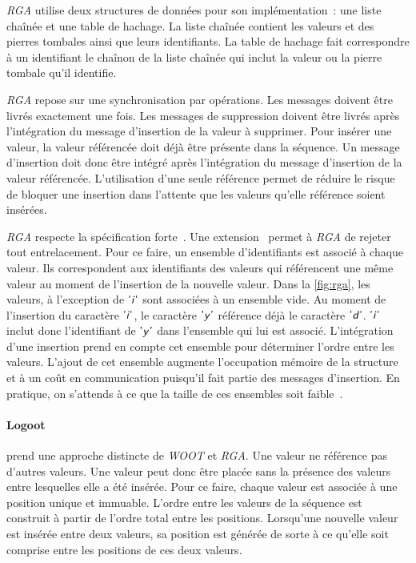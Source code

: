 \emph{RGA} utilise deux structures de données pour son implémentation~: une liste chaînée et une table de hachage.
La liste chaînée contient les valeurs et des pierres tombales ainsi que leurs identifiants.
La table de hachage fait correspondre à un identifiant le chaînon de la liste chaînée qui inclut la valeur ou la pierre tombale qu'il identifie.

\emph{RGA} repose sur une synchronisation par opérations.
Les messages doivent être livrés exactement une fois.
Les messages de suppression doivent être livrés après l'intégration du message d'insertion de la valeur à supprimer.
Pour insérer une valeur, la valeur référencée doit déjà être présente dans la séquence.
Un message d'insertion doit donc être intégré après l'intégration du message d'insertion de la valeur référencée.
L'utilisation d'une seule référence permet de réduire le risque de bloquer une insertion dans l'attente que les valeurs qu'elle référence soient insérées.

\emph{RGA} respecte la spécification forte~\autocite{attiyai_2016_spec-text-editing}.
Une extension~\autocite{kleppmann2019_interleaving} permet à \emph{RGA} de rejeter tout entrelacement.
Pour ce faire, un ensemble d'identifiants est associé à chaque valeur.
Ils correspondent aux identifiants des valeurs qui référencent une même valeur au moment de l'insertion de la nouvelle valeur.
Dans la \autoref{fig:rga}, les valeurs, à l'exception de $\textsf{'\textit{i}'}$ sont associées à un ensemble vide.
Au moment de l'insertion du caractère $\textsf{'\textit{i}'}$, le caractère $\textsf{'\textit{y}'}$ référence déjà le caractère $\textsf{'\textit{d}'}$.
$\textsf{'\textit{i}'}$ inclut donc l'identifiant de $\textsf{'\textit{y}'}$ dans l'ensemble qui lui est associé.
L'intégration d'une insertion prend en compte cet ensemble pour déterminer l'ordre entre les valeurs.
L'ajout de cet ensemble augmente l'occupation mémoire de la structure et à un coût en communication puisqu'il fait partie des messages d'insertion.
En pratique, on s'attends à ce que la taille de ces ensembles soit faible~\autocite{kleppmann2019_interleaving}.




\paragraph{Logoot}\autocite{weiss_2009_logoot} prend une approche distincte de \emph{WOOT} et \emph{RGA}.
Une valeur ne référence pas d'autres valeurs.
Une valeur peut donc être placée sans la présence des valeurs entre lesquelles elle a été insérée.
Pour ce faire, chaque valeur est associée à une position unique et immuable.
L'ordre entre les valeurs de la séquence est construit à partir de l'ordre total entre les positions.
Lorsqu'une nouvelle valeur est insérée entre deux valeurs, sa position est générée de sorte à ce qu'elle soit comprise entre les positions de ces deux valeurs.


